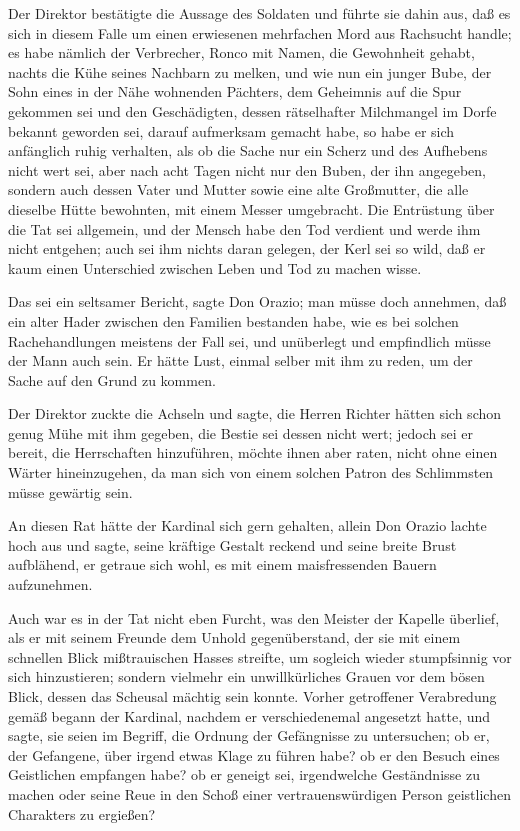 Der Direktor bestätigte die Aussage des Soldaten und führte sie
dahin aus, daß es sich in diesem Falle um einen erwiesenen
mehrfachen Mord aus Rachsucht handle; es habe nämlich der
Verbrecher, Ronco mit Namen, die Gewohnheit gehabt, nachts die Kühe
seines Nachbarn zu melken, und wie nun ein junger Bube, der Sohn
eines in der Nähe wohnenden Pächters, dem Geheimnis auf die Spur
gekommen sei und den Geschädigten, dessen rätselhafter Milchmangel
im Dorfe bekannt geworden sei, darauf aufmerksam gemacht habe, so
habe er sich anfänglich ruhig verhalten, als ob die Sache nur ein
Scherz und des Aufhebens nicht wert sei, aber nach acht Tagen nicht
nur den Buben, der ihn angegeben, sondern auch dessen Vater und
Mutter sowie eine alte Großmutter, die alle dieselbe Hütte
bewohnten, mit einem Messer umgebracht. Die Entrüstung über die Tat
sei allgemein, und der Mensch habe den Tod verdient und werde ihm
nicht entgehen; auch sei ihm nichts daran gelegen, der Kerl sei so
wild, daß er kaum einen Unterschied zwischen Leben und Tod zu
machen wisse.

\pagenum{[68]}Das sei ein seltsamer Bericht, sagte Don Orazio; man
müsse doch annehmen, daß ein alter Hader zwischen den Familien
bestanden habe, wie es bei solchen Rachehandlungen meistens der
Fall sei, und unüberlegt und empfindlich müsse der Mann auch sein.
Er hätte Lust, einmal selber mit ihm zu reden, um der Sache auf den
Grund zu kommen.

Der Direktor zuckte die Achseln und sagte, die Herren Richter
hätten sich schon genug Mühe mit ihm gegeben, die Bestie sei dessen
nicht wert; jedoch sei er bereit, die Herrschaften hinzuführen,
möchte ihnen aber raten, nicht ohne einen Wärter hineinzugehen, da
man sich von einem solchen Patron des Schlimmsten müsse gewärtig
sein.

An diesen Rat hätte der Kardinal sich gern gehalten, allein Don
Orazio lachte hoch aus und sagte, seine kräftige Gestalt reckend
und seine breite Brust aufblähend, er getraue sich wohl, es mit
einem maisfressenden Bauern aufzunehmen.

Auch war es in der Tat nicht eben Furcht, was den Meister der
Kapelle überlief, als er mit seinem Freunde dem Unhold
gegenüberstand, der sie mit einem schnellen Blick mißtrauischen
Hasses streifte, um sogleich wieder stumpfsinnig vor sich
hinzustieren; sondern vielmehr ein unwillkürliches Grauen vor dem
bösen Blick, dessen das Scheusal mächtig sein konnte. Vorher
getroffener Verabredung gemäß begann der Kardinal, nachdem er
verschiedenemal angesetzt hatte, und sagte, sie seien im Begriff,
die Ordnung der Gefängnisse zu untersuchen; ob er, der Gefangene,
über irgend etwas Klage zu führen habe? ob er den Besuch eines
Geistlichen empfangen habe? ob er geneigt sei, irgendwelche
Geständnisse zu machen oder seine Reue in den Schoß einer
vertrauenswürdigen Person geistlichen Charakters zu ergießen?

